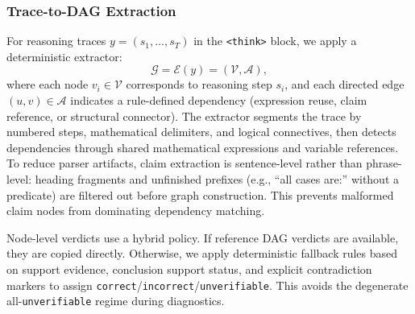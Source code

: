 \subsubsection{Trace-to-DAG Extraction}
For reasoning traces $y=(s_1,\ldots,s_T)$ in the \texttt{<think>} block, we apply a deterministic extractor:
\begin{equation}
\label{eq:extractor}
\mathcal{G}=\mathcal{E}(y)=(\mathcal{V},\mathcal{A}),
\end{equation}
where each node $v_i\in\mathcal{V}$ corresponds to reasoning step $s_i$, and each directed edge $(u,v)\in\mathcal{A}$ indicates a rule-defined dependency (expression reuse, claim reference, or structural connector).
The extractor segments the trace by numbered steps, mathematical delimiters, and logical connectives, then detects dependencies through shared mathematical expressions and variable references.
To reduce parser artifacts, claim extraction is sentence-level rather than phrase-level:
heading fragments and unfinished prefixes (e.g., ``all cases are:'' without a predicate) are filtered out before graph construction.
This prevents malformed claim nodes from dominating dependency matching.

Node-level verdicts use a hybrid policy.
If reference DAG verdicts are available, they are copied directly.
Otherwise, we apply deterministic fallback rules based on support evidence, conclusion support status, and explicit contradiction markers to assign \texttt{correct}/\texttt{incorrect}/\texttt{unverifiable}.
This avoids the degenerate all-\texttt{unverifiable} regime during diagnostics.



